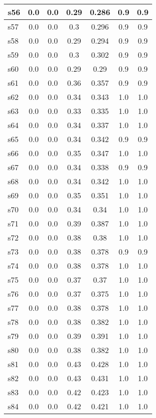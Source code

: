 \documentclass{article}
\begin{document}
\begin{tabular}{|l|c|c|c|c|c|c|}
\hline
s56 &0.0 & 0.0 & 0.29 & 0.286 & 0.9 & 0.9\\
\hline
s57 &0.0 & 0.0 & 0.3 & 0.296 & 0.9 & 0.9\\
\hline
s58 &0.0 & 0.0 & 0.29 & 0.294 & 0.9 & 0.9\\
\hline
s59 &0.0 & 0.0 & 0.3 & 0.302 & 0.9 & 0.9\\
\hline
s60 &0.0 & 0.0 & 0.29 & 0.29 & 0.9 & 0.9\\
\hline
s61 &0.0 & 0.0 & 0.36 & 0.357 & 0.9 & 0.9\\
\hline
s62 &0.0 & 0.0 & 0.34 & 0.343 & 1.0 & 1.0\\
\hline
s63 &0.0 & 0.0 & 0.33 & 0.335 & 1.0 & 1.0\\
\hline
s64 &0.0 & 0.0 & 0.34 & 0.337 & 1.0 & 1.0\\
\hline
s65 &0.0 & 0.0 & 0.34 & 0.342 & 0.9 & 0.9\\
\hline
s66 &0.0 & 0.0 & 0.35 & 0.347 & 1.0 & 1.0\\
\hline
s67 &0.0 & 0.0 & 0.34 & 0.338 & 0.9 & 0.9\\
\hline
s68 &0.0 & 0.0 & 0.34 & 0.342 & 1.0 & 1.0\\
\hline
s69 &0.0 & 0.0 & 0.35 & 0.351 & 1.0 & 1.0\\
\hline
s70 &0.0 & 0.0 & 0.34 & 0.34 & 1.0 & 1.0\\
\hline
s71 &0.0 & 0.0 & 0.39 & 0.387 & 1.0 & 1.0\\
\hline
s72 &0.0 & 0.0 & 0.38 & 0.38 & 1.0 & 1.0\\
\hline
s73 &0.0 & 0.0 & 0.38 & 0.378 & 0.9 & 0.9\\
\hline
s74 &0.0 & 0.0 & 0.38 & 0.378 & 1.0 & 1.0\\
\hline
s75 &0.0 & 0.0 & 0.37 & 0.37 & 1.0 & 1.0\\
\hline
s76 &0.0 & 0.0 & 0.37 & 0.375 & 1.0 & 1.0\\
\hline
s77 &0.0 & 0.0 & 0.38 & 0.378 & 1.0 & 1.0\\
\hline
s78 &0.0 & 0.0 & 0.38 & 0.382 & 1.0 & 1.0\\
\hline
s79 &0.0 & 0.0 & 0.39 & 0.391 & 1.0 & 1.0\\
\hline
s80 &0.0 & 0.0 & 0.38 & 0.382 & 1.0 & 1.0\\
\hline
s81 &0.0 & 0.0 & 0.43 & 0.428 & 1.0 & 1.0\\
\hline
s82 &0.0 & 0.0 & 0.43 & 0.431 & 1.0 & 1.0\\
\hline
s83 &0.0 & 0.0 & 0.42 & 0.423 & 1.0 & 1.0\\
\hline
s84 &0.0 & 0.0 & 0.42 & 0.421 & 1.0 & 1.0\\

\end{tabular}
\end{document}
